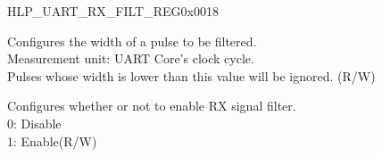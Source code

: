 \begin{register}{H}{LP\_UART\_RX\_FILT\_REG}{0x0018}\label{regdesc:LPUARTRXFILTREG}
%
%
%
\regnewline%
\begin{regdesc}\begin{reglist}
\label{fielddesc:LPUARTGLITCHFILT}\item [LP\_UART\_GLITCH\_FILT] Configures the width of a pulse to be filtered.\\Measurement unit: UART Core's clock cycle.\\Pulses whose width is lower than this value will be ignored. (R/W)
\label{fielddesc:LPUARTGLITCHFILTEN}\item [LP\_UART\_GLITCH\_FILT\_EN] Configures whether or not to enable RX signal filter.\\
0: Disable\\
1: Enable(R/W)
\end{reglist}\end{regdesc}
\end{register}


